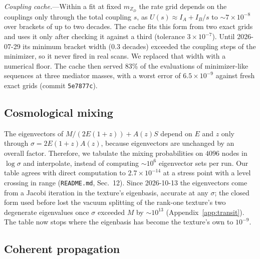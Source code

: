 \documentclass[11pt,a4paper]{article}
\newcommand{\file}[1]{\nolinkurl{#1}}
\newcommand{\mzd}{m_{Z_D}}
\begin{document}
\textit{Coupling cache.}---Within a fit at fixed $\mzd$ the rate grid depends on the couplings
only through the total coupling $s$, as $U(s) \approx I_A + I_B/s$ to $\sim7\times10^{-8}$
over brackets of up to two decades. The cache fits this form from two exact grids and uses it
only after checking it against a third (tolerance $3\times10^{-7}$). Until 2026-07-29 its
minimum bracket width ($0.3$ decades) exceeded the coupling steps of the minimizer, so it
never fired in real scans. We replaced that width with a numerical floor. The cache then served
83\% of the evaluations of minimizer-like sequences at three mediator masses, with a worst error
of $6.5\times10^{-9}$ against fresh exact grids (commit \texttt{5e7877c}).

\subsection{Cosmological mixing}

The eigenvectors of $M/(2E(1+z)) + A(z) S$ depend on $E$ and $z$ only through
$\sigma = 2E(1+z)A(z)$, because eigenvectors are unchanged by an overall factor. Therefore, we
tabulate the mixing probabilities on $4096$ nodes in $\log\sigma$ and interpolate, instead of
computing $\sim10^6$ eigenvector sets per run. Our table agrees with direct computation to
$2.7\times10^{-14}$ at a stress point with a level crossing in range (\file{README.md},
Sec.~12). Since 2026-10-13 the eigenvectors come from a Jacobi iteration in the texture's
eigenbasis, accurate at any $\sigma$; the closed form used before lost the vacuum splitting of the
rank-one texture's two degenerate eigenvalues once $\sigma$ exceeded $M$ by $\sim10^{13}$
(Appendix~\ref{app:transit}). The table now stops where the eigenbasis has become the texture's
own to $10^{-9}$.

\subsection{Coherent propagation}
\end{document}
